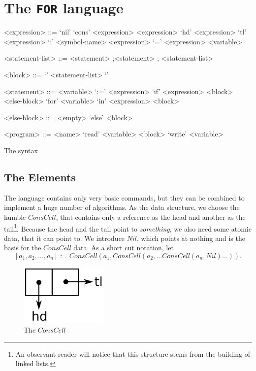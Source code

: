 \section{The {\tt FOR} language}
\label{sec:FOR}
\begin{table}[htb]
	\begin{grammar}
		<expression> ::= 
							`nil' 
				\alt 	`cons' <expression> <expression>
				\alt 	`hd' <expression>
				\alt 	`tl' <expression>
				\alt		`:' <symbol-name>
				\alt		<expression> `=' <expression>
				\alt 	<variable>

		<statement-list> ::= <statement> ;\alt <statement> ; <statement-list>

		<block> ::= `{' <statement-list> `}'

		<statement> ::=
							<variable> `:=' <expression>
				\alt	`if' <expression> <block> <else-block>
				\alt	`for' <variable> `in' <expression> <block>
			
				<else-block> ::= <empty> \alt `else' <block>
				
				<program> ::= <name> `read' <variable> <block> `write' <variable>
	\end{grammar}
	\caption{The \FOR syntax \label{tab:FOR-syntax}}
\end{table}

\subsection{The Elements} %
\label{sub:TheElements}
The \FOR language contains only very basic commands, but they can be combined
to implement a huge number of algorithms. As the data structure, we choose 
the humble $ConsCell$, that contains only a reference as the head and 
another as the tail\footnote{An observant reader will notice that this
structure stems from the building of linked lists.}. Because the head and the tail point to \emph{something}, we also need some 
atomic data, that it can point to. We introduce $Nil$, which points at 
nothing and is the basis for the $ConsCell$ data. As a short cut notation, let 
\[[a_1, a_2, \dots, a_n] := ConsCell(a_1, ConsCell(a_2, \dots ConsCell(a_n, Nil)\dots )).\]
\begin{figure}[htb]
	\begin{center}
		\includegraphics[height=3cm]{introduction/for/images/conscell}
	\end{center}
	\caption{The $ConsCell$}
\end{figure}

